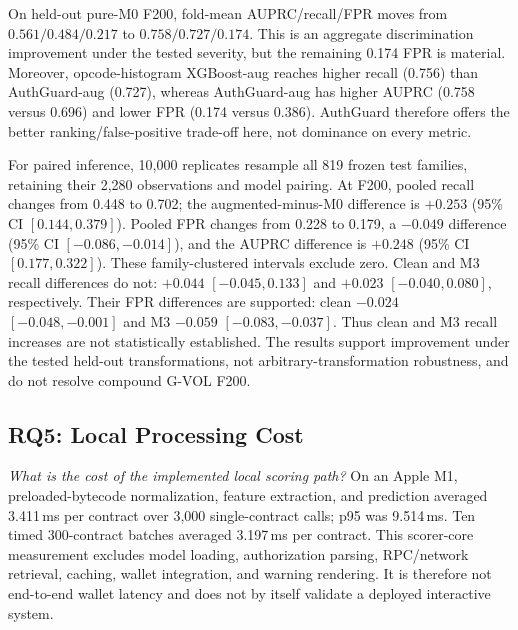 On held-out pure-M0 F200, fold-mean AUPRC/recall/FPR moves from $0.561/0.484/0.217$ to $0.758/0.727/0.174$. This is an aggregate discrimination improvement under the tested severity, but the remaining 0.174 FPR is material. Moreover, opcode-histogram XGBoost-aug reaches higher recall (0.756) than AuthGuard-aug (0.727), whereas AuthGuard-aug has higher AUPRC (0.758 versus 0.696) and lower FPR (0.174 versus 0.386). AuthGuard therefore offers the better ranking/false-positive trade-off here, not dominance on every metric.

For paired inference, 10,000 replicates resample all 819 frozen test families, retaining their 2,280 observations and model pairing. At F200, pooled recall changes from 0.448 to 0.702; the augmented-minus-M0 difference is $+0.253$ (95\% CI $[0.144,0.379]$). Pooled FPR changes from 0.228 to 0.179, a $-0.049$ difference (95\% CI $[-0.086,-0.014]$), and the AUPRC difference is $+0.248$ (95\% CI $[0.177,0.322]$). These family-clustered intervals exclude zero. Clean and M3 recall differences do not: $+0.044$ $[-0.045,0.133]$ and $+0.023$ $[-0.040,0.080]$, respectively. Their FPR differences are supported: clean $-0.024$ $[-0.048,-0.001]$ and M3 $-0.059$ $[-0.083,-0.037]$. Thus clean and M3 recall increases are not statistically established. The results support improvement under the tested held-out transformations, not arbitrary-transformation robustness, and do not resolve compound G-VOL F200.

\subsection{RQ5: Local Processing Cost}

\emph{What is the cost of the implemented local scoring path?} On an Apple M1, preloaded-bytecode normalization, feature extraction, and prediction averaged 3.411\,ms per contract over 3,000 single-contract calls; p95 was 9.514\,ms. Ten timed 300-contract batches averaged 3.197\,ms per contract. This scorer-core measurement excludes model loading, authorization parsing, RPC/network retrieval, caching, wallet integration, and warning rendering. It is therefore not end-to-end wallet latency and does not by itself validate a deployed interactive system.
